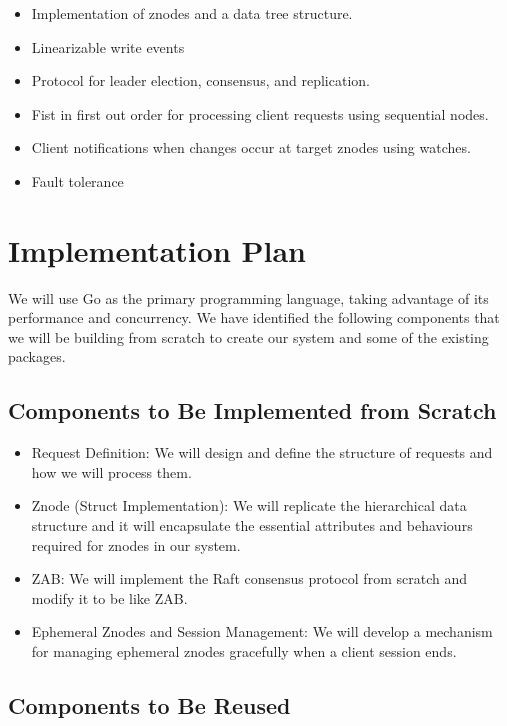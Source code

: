 \documentclass[
course = 50.041,
assignmenttype = {{Jaguard}},
assignment = {{}},
name = {{Group 5}},
studentnumber = {{Report}}
]{style}
\begin{document}
\begin{itemize}
    \item Implementation of znodes and a data tree structure.
    \item Linearizable write events
    \item Protocol for leader election, consensus, and replication.
    \item Fist in first out order for processing client requests using sequential nodes.
    \item Client notifications when changes occur at target znodes using watches.
    \item Fault tolerance
\end{itemize}

\section{Implementation Plan}

We will use Go as the primary programming language, taking advantage of its performance and concurrency. We have identified the following components that we will be building from scratch to create our system and some of the existing packages.

\subsection{Components to Be Implemented from Scratch}

\begin{itemize}
    \item Request Definition: We will design and define the structure of requests and how we will process them. 
    \item Znode (Struct Implementation): We will replicate the hierarchical data structure and it will encapsulate the essential attributes and behaviours required for znodes in our system.
    \item ZAB: We will implement the Raft consensus protocol from scratch and modify it to be like ZAB. 
    \item Ephemeral Znodes and Session Management: We will develop a mechanism for managing ephemeral znodes gracefully when a client session ends. 
\end{itemize}

\subsection{Components to Be Reused}
\end{document}
